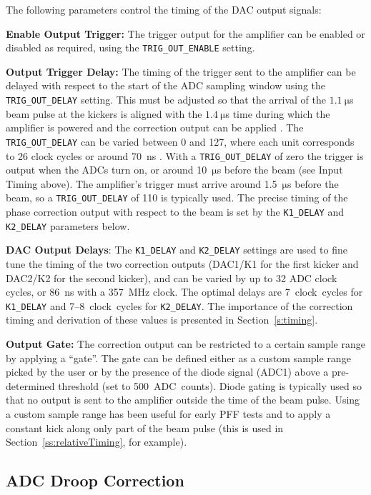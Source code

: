 \noindent The following parameters control the timing of the DAC output signals:

\textbf{Enable Output Trigger:} The trigger output for the amplifier can be enabled or disabled as required, using the \texttt{TRIG\_OUT\_ENABLE} setting.

\textbf{Output Trigger Delay:} The timing of the trigger sent to the amplifier can be delayed with respect to the start of the ADC sampling window using the \texttt{TRIG\_OUT\_DELAY} setting. This must be adjusted so that the arrival of the \(1.1~\mathrm{\mu}\)s beam pulse at the kickers is aligned with the \(1.4~\mathrm{\mu}\)s time during which the amplifier is powered and the correction output can be applied \cite{colinPriv}. The \texttt{TRIG\_OUT\_DELAY} can be varied between 0 and 127, where each unit corresponds to 26 clock cycles or around 70~ns \cite{glennPriv}. With a \texttt{TRIG\_OUT\_DELAY} of zero the trigger is output when the ADCs turn on, or around 10~\(\mathrm{\mu}\)s before the beam (see Input Timing above). The amplifier's trigger must arrive around 1.5~\(\mathrm{\mu}\)s before the beam, so a \texttt{TRIG\_OUT\_DELAY} of 110 is typically used. The precise timing of the phase correction output with respect to the beam is set by the \texttt{K1\_DELAY} and \texttt{K2\_DELAY} parameters below.

\textbf{DAC Output Delays}: The \texttt{K1\_DELAY} and \texttt{K2\_DELAY} settings are used to fine tune the timing of the two correction outputs (DAC1/K1 for the first kicker and DAC2/K2 for the second kicker), and can be varied by up to 32 ADC clock cycles, or 86~ns with a 357~MHz clock. The optimal delays are 7~clock~cycles for \texttt{K1\_DELAY} and 7--8~clock~cycles for \texttt{K2\_DELAY}. The importance of the correction timing and derivation of these values is presented in Section~\ref{s:timing}.

\textbf{Output Gate:} The correction output can be restricted to a certain sample range by applying a ``gate''. The gate can be defined either as a custom sample range picked by the user or by the presence of the diode signal (ADC1) above a pre-determined threshold (set to 500~ADC~counts). Diode gating is typically used so that no output is sent to the amplifier outside the time of the beam pulse. Using a custom sample range has been useful for early PFF tests and to apply a constant kick along only part of the beam pulse (this is used in Section~\ref{ss:relativeTiming}, for example).


\subsection{ADC Droop Correction}
\label{ss:droopCorr}

